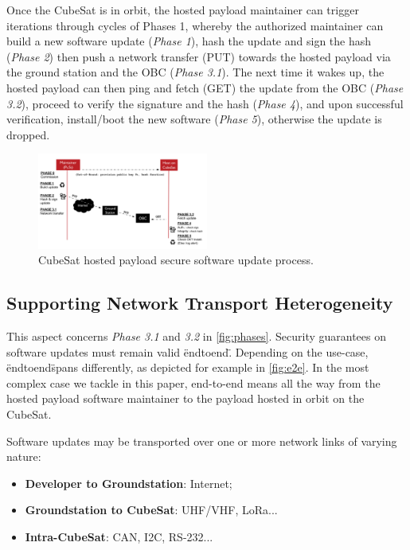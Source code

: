 Once the CubeSat is in orbit, the hosted payload maintainer can trigger iterations through cycles of Phases 1, whereby
the authorized maintainer can build a new software update (\textit{Phase 1}), hash the update
and sign the hash (\textit{Phase 2}) then push a network transfer (PUT) towards the hosted payload
via the ground station and the OBC (\textit{Phase 3.1}). The next time it wakes up, the hosted payload can
then ping and fetch (GET) the update from the OBC (\textit{Phase 3.2}), proceed to verify the signature and the hash (\textit{Phase 4}),
and upon successful verification, install/boot the new software (\textit{Phase 5}), otherwise the update is dropped.

\begin{figure}[t]
    \centering
    \includegraphics[width=0.5\textwidth]{Figures/CubeSat-Payload-update.png}
    \caption{CubeSat hosted payload secure software update process.}
    \label{fig:phases}
\end{figure}

\subsection{Supporting Network Transport Heterogeneity}
This aspect concerns \textit{Phase 3.1} and \textit{3.2} in \autoref{fig:phases}. Security guarantees on
software updates must remain valid \"end\-to\-end\". Depending on the use-case, \"end\-to\-end\" spans differently,
as depicted for example in \autoref{fig:e2e}. In the most complex case we tackle in this paper,
end-to-end means all the way from the hosted payload software maintainer to the payload hosted in orbit on the CubeSat.

Software updates may be transported over one or more network links of varying nature:
\begin{itemize}
\item {\bf Developer to Groundstation}: Internet;
\item {\bf Groundstation to CubeSat}: UHF/VHF, LoRa...
\item {\bf Intra-CubeSat}: CAN, I2C, RS-232...
\end{itemize}


